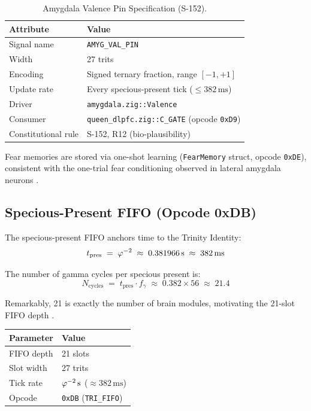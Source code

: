 \begin{table}[htbp]
\centering
\caption{Amygdala Valence Pin Specification (S-152).}
\label{tab:flos73-valpin}
\begin{tabular}{ll}
\toprule
Attribute & Value \\
\midrule
Signal name   & \texttt{AMYG\_VAL\_PIN} \\
Width         & 27 trits \\
Encoding      & Signed ternary fraction, range $[-1, +1]$ \\
Update rate   & Every specious-present tick ($\leq 382\,\text{ms}$) \\
Driver        & \texttt{amygdala.zig::Valence} \\
Consumer      & \texttt{queen\_dlpfc.zig::C\_GATE} (opcode \texttt{0xD9}) \\
Constitutional rule & S-152, R12 (bio-plausibility) \\
\bottomrule
\end{tabular}
\end{table}

Fear memories are stored via one-shot learning (\texttt{FearMemory} struct,
opcode \texttt{0xDE}), consistent with the one-trial fear conditioning observed
in lateral amygdala neurons \cite{damasio_1996,bechara_1999}.

\subsection{Specious-Present FIFO (Opcode 0xDB)}
\label{ssec:flos73-fifo}

The specious-present FIFO anchors time to the Trinity Identity:
\[
  t_{\text{pres}} \;=\; \varphi^{-2} \;\approx\; 0.381966\,\text{s} \;\approx\; 382\,\text{ms}
\]

The number of gamma cycles per specious present is:
\[
  N_{\text{cycles}} \;=\; t_{\text{pres}}\cdot f_\gamma
                    \;\approx\; 0.382 \times 56 \;\approx\; 21.4
\]

Remarkably, 21 is exactly the number of brain modules, motivating the 21-slot
FIFO depth \cite{tada_2021,mlineric_2025}.

\begin{center}
\begin{tabular}{ll}
\toprule
Parameter & Value \\
\midrule
FIFO depth  & 21 slots \\
Slot width  & 27 trits \\
Tick rate   & $\varphi^{-2}\,\text{s}$ ($\approx 382\,\text{ms}$) \\
Opcode      & \texttt{0xDB} (\texttt{TRI\_FIFO}) \\
\bottomrule
\end{tabular}
\end{center}

